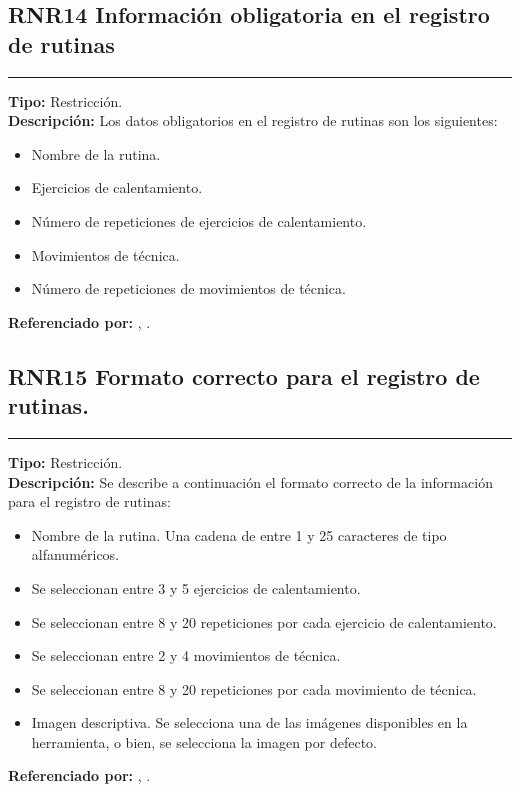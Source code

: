 \subsection{\normalsize{\textcolor[rgb]{0, 0, 0.545098}{RNR14 Información obligatoria en el registro de rutinas}}}
\label{rn:RNR14}
\rule[3mm]{16.59cm}{0.1mm} \vspace{1mm}
\textbf{Tipo:} Restricción.\\
\textbf{Descripción:} Los datos obligatorios en el registro de rutinas son los siguientes:
\begin{itemize} \itemsep1pt \parskip0pt 
	\item Nombre de la rutina.
	\item Ejercicios de calentamiento.
	\item Número de repeticiones de ejercicios de calentamiento.
	\item Movimientos de técnica.
	\item Número de repeticiones de movimientos de técnica.
\end{itemize}
\textbf{Referenciado por: } ,  .\\

\subsection{\normalsize{\textcolor[rgb]{0, 0, 0.545098}{RNR15 Formato correcto para el registro de rutinas.}}}
\label{rn:RNR15}
\rule[3mm]{16.59cm}{0.1mm} \vspace{1mm}
\textbf{Tipo:} Restricción.\\
\textbf{Descripción:} Se describe a continuación el formato correcto de la información para el registro de rutinas:
\begin{itemize} \itemsep1pt \parskip0pt 
	\item Nombre de la rutina.  Una cadena de entre 1 y 25 caracteres de tipo alfanuméricos.
	\item Se seleccionan entre 3 y 5 ejercicios de calentamiento.
	\item Se seleccionan entre 8 y 20 repeticiones por cada ejercicio de calentamiento.
	\item Se seleccionan entre 2 y 4  movimientos de técnica.
	\item Se seleccionan entre 8 y 20 repeticiones por cada movimiento de técnica.
	\item Imagen descriptiva. Se selecciona una de las imágenes disponibles en la herramienta, o bien, se selecciona la imagen por defecto.
\end{itemize}
\textbf{Referenciado por: } ,  .\\

